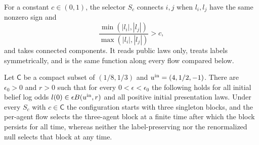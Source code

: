 For a constant $c\in(0,1)$, the selector $S_c$ connects $i,j$ when $l_i,l_j$ have the same nonzero sign and
\begin{equation}
 \frac{\min(|l_i|,|l_j|)}{\max(|l_i|,|l_j|)}>c,
 \label{pa:selector}
\end{equation}
and takes connected components. It reads public laws only, treats labels symmetrically, and is the same function along every flow compared below.

Let $\mathsf C$ be a compact subset of $(1/8,1/3)$ and $u^{\rm in}=(4,1/2,-1)$. There are $\epsilon_0>0$ and $r>0$ such that for every $0<\epsilon<\epsilon_0$ the following holds for all initial belief log odds $l(0)\in\epsilon B(u^{\rm in},r)$ and all positive initial presentation laws. Under every $S_c$ with $c\in\mathsf C$ the configuration starts with three singleton blocks, and the per-agent flow selects the three-agent block at a finite time after which the block persists for all time, whereas neither the label-preserving nor the renormalized null selects that block at any time.
